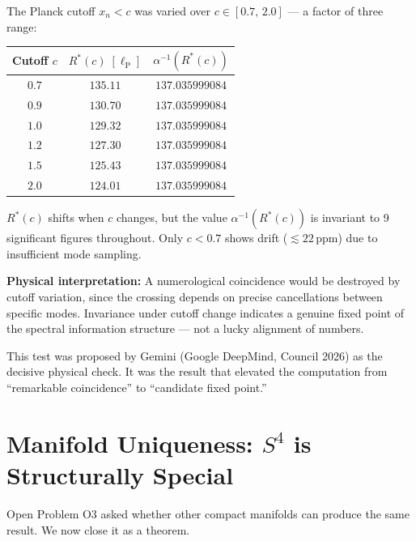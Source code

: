 \documentclass[12pt,a4paper]{article}
\newcommand{\lP}{\ell_{\mathrm{P}}}
\newcommand{\ai}{\alpha^{-1}}
\begin{document}
\begin{Tbox}
The Planck cutoff $x_n < c$ was varied over
$c \in [0.7,\,2.0]$ --- a factor of three range:

\begin{center}
\begin{tabular}{ccc}
\toprule
Cutoff $c$ & $R^*(c)\;[\lP]$ & $\ai(R^*(c))$ \\
\midrule
$0.7$ & $135.11$ & $137.035999084$ \\
$0.9$ & $130.70$ & $137.035999084$ \\
$1.0$ & $129.32$ & $137.035999084$ \\
$1.2$ & $127.30$ & $137.035999084$ \\
$1.5$ & $125.43$ & $137.035999084$ \\
$2.0$ & $124.01$ & $137.035999084$ \\
\bottomrule
\end{tabular}
\end{center}

$R^*(c)$ shifts when $c$ changes, but the value
$\ai(R^*(c))$ is invariant to 9 significant figures
throughout.
Only $c < 0.7$ shows drift ($\lesssim 22\,$ppm)
due to insufficient mode sampling.

\textbf{Physical interpretation:}
A numerological coincidence would be destroyed by
cutoff variation, since the crossing depends
on precise cancellations between specific modes.
Invariance under cutoff change indicates a genuine
fixed point of the spectral information structure ---
not a lucky alignment of numbers.
\end{Tbox}

This test was proposed by Gemini (Google DeepMind,
Council 2026) as the decisive physical check.
It was the result that elevated the computation from
``remarkable coincidence'' to ``candidate fixed point.''


\section{Manifold Uniqueness: $S^4$ is Structurally Special}
\label{sec:O3}

Open Problem O3 asked whether other compact manifolds
can produce the same result.
We now close it as a theorem.
\end{document}
